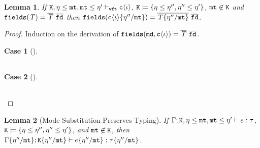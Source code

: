 \documentclass[onecolumn,nocopyrightspace]{sigplanconf}
\newtheorem{lemma}{Lemma}
\theoremstyle{lessintrusive}
\theoremstyle{plain}
\theoremstyle{custom}
\newtheorem*{case}{Case}
\theoremstyle{subcase-custom}
\begin{document}
\begin{lemma}
\label{pf:ffields-substitutes}
If $\mathtt{K},\eta\leq\mathtt{mt},\mathtt{mt}\leq\eta'\vdash_{\tt wft}\mathtt{c}\langle\iota\rangle$, $\mathtt{K}\models\{\eta\leq\eta'',\eta''\leq\eta'\}$, $\mathtt{mt} \not\in \mathtt{K}$ and $\Ffields(\bt) = \overline{\bt}\ \overline{\Fname}$ then $\Ffields(\classiota\subst{\mtvar}{\basemode''}) = \overline{\bt\subst{\mtvar}{\basemode''}}\ \overline{\Fname}$.
\end{lemma} 

\begin{proof}
Induction on the derivation of $\Ffields(\Mname,\classiota) = \overline{\bt}\ \overline{\Fname}$.

\begin{case}[] 
\begin{tabular}[t]{>{$}l<{$} >{$}l<{$} >{$}l<{$}}
\end{tabular}
\end{case}

\begin{case}[] 
\begin{tabular}[t]{>{$}l<{$} >{$}l<{$} >{$}l<{$}}
\end{tabular}
\end{case}

\end{proof}

\begin{lemma}[Mode Substitution Preserves Typing]
\label{pf:modesubstitution-preserves-typing}
If $\Gamma;\mathtt{K},\eta\leq\mathtt{mt},\mathtt{mt}\leq\eta'\vdash e:\tau$, $\mathtt{K}\models\{\eta\leq\eta'',\eta''\leq\eta'\}$, and $\mathtt{mt} \not\in \mathtt{K}$, then $\Gamma\{\eta''/\mathtt{mt}\};\mathtt{K}\{\eta''/\mathtt{mt}\}\vdash e\{\eta''/\mathtt{mt}\}:\tau\{\eta''/\mathtt{mt}\}$.
\end{lemma}
\end{document}
